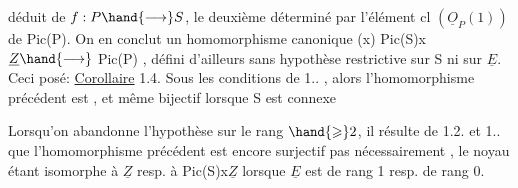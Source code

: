 
déduit de $f:P\hand{\longrightarrow} S$, le deuxième  déterminé par l'élément  cl $(\underline{O}_P(1))$ de
Pic(P). On en conclut un homomorphisme canonique
(x) \qquad Pic(S)x $\underline{Z} \hand{\longrightarrow}$ Pic(P)  ,
défini d'ailleurs sans hypothèse restrictive sur S ni sur $\underline{E}$.  Ceci posé:
\uline{Corollaire} 1.4.\margin{\ensuremath{\swarrow}}   Sous les conditions de 1.. ,  
 alors l'homomorphisme précédent est   , et même
bijectif lorsque S est connexe

\margin{[} Lorsqu'on  abandonne l'hypothèse
sur le rang $\hand{\geqslant} 2$,  il résulte de 1.2. et 1.. que l'homomorphisme précédent
est encore surjectif  pas nécessairement , le noyau étant
isomorphe 
à $\underline{Z}$  resp. à  Pic(S)x$\underline{Z}$  lorsque  $\underline{E}$  est de rang 1\hand{,} resp. de rang 0.

